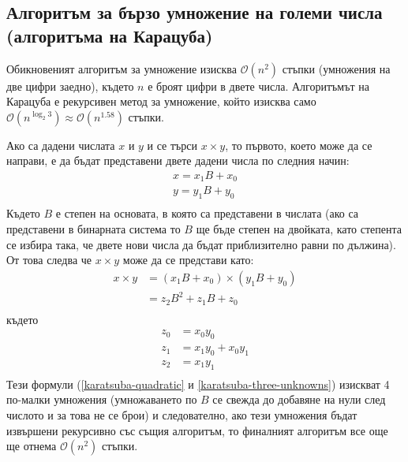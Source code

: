   \subsection{Алгоритъм за бързо умножение на големи числа (алгоритъма на Карацуба)} \label{karatsuba}
  Обикновеният алгоритъм за умножение изисква $\mathcal{O}(n^2)$ стъпки (умножения на две цифри заедно), където $n$ е броят цифри в двете числа. Алгоритъмът на Карацуба е рекурсивен метод за умножение, който изисква само $\mathcal{O}(n^{\log_2 3}) \approx \mathcal{O}(n^{1.58})$ стъпки.

  Ако са дадени числата $x$ и $y$ и се търси $x \times y$, то първото, което може да се направи, е да бъдат представени двете дадени числа по следния начин:
  \begin{equation}
    \begin{split}
      x = x_1 B + x_0 \\
      y = y_1 B + y_0 \\
    \end{split}
    \label{karatsuba-breakability}
  \end{equation}
  Където $B$ е степен на основата, в която са представени в числата (ако са представени в бинарната система то $B$ ще бъде степен на двойката, като степента се избира така, че двете нови числа да бъдат приблизително равни по дължина). От това следва че $x \times y$ може да се представи като:
  \begin{equation}
    \begin{split}
      x \times y &= (x_1 B + x_0) \times (y_1 B + y_0) \\
                 &= z_2 B^2 + z_1 B + z_0 \\
    \end{split}
    \label{karatsuba-quadratic}
  \end{equation}
  където
  \begin{equation}
    \begin{split}
      z_0 &= x_0 y_0 \\
      z_1 &= x_1 y_0 + x_0 y_1 \\
      z_2 &= x_1 y_1 \\
    \end{split}
    \label{karatsuba-three-unknowns}
  \end{equation}
  Тези формули (\ref{karatsuba-quadratic} и \ref{karatsuba-three-unknowns}) изискват 4 по-малки умножения (умножаването по $B$ се свежда до добавяне на нули след числото и за това не се брои) и следователно, ако тези умножения бъдат извършени рекурсивно със същия алгоритъм, то финалният алгоритъм все още ще отнема $\mathcal{O}(n^2)$ стъпки.

